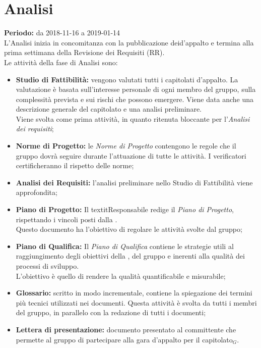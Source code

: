 \section{Analisi}
\textbf{Periodo:} da 2018-11-16 a 2019-01-14\\L'Analisi inizia in concomitanza con la pubblicazione deid’appalto e termina alla prima settimana della  Revisione dei Requisiti (RR).\\
Le attività della fase di Analisi sono:
\begin{itemize}
    \item \textbf{Studio di Fattibilità:} vengono valutati tutti i capitolati d'appalto. La valutazione è basata sull'interesse personale di ogni membro del gruppo, sulla complessità prevista e sui rischi che possono emergere. Viene data anche una descrizione generale del capitolato e una analisi preliminare.\\Viene svolta come prima attività, in quanto ritenuta bloccante per l'\textit{Analisi dei requisiti};
    \item \textbf{Norme di Progetto:} le \textit{Norme di Progetto} contengono le regole che il gruppo dovrà seguire durante l'attuazione di tutte le attività. I verificatori certificheranno il rispetto delle norme;
    \item \textbf{Analisi dei Requisiti:} l'analisi preliminare nello Studio di Fattibilità viene approfondita;
    \item \textbf{Piano di Progetto:} Il textit{Responsabile} redige il \textit{Piano di Progetto}, rispettando i vincoli posti dalla .\\Questo documento ha l'obiettivo di regolare le attività svolte dal gruppo;
    \item \textbf{Piano di Qualifica:} Il \textit{Piano di Qualifica} contiene le strategie utili al raggiungimento degli obiettivi della , del gruppo e inerenti alla qualità dei processi di sviluppo.\\L'obiettivo è quello di rendere la qualità quantificabile e misurabile;
    \item \textbf{Glossario:} scritto in modo incrementale, contiene la spiegazione dei termini più tecnici utilizzati nei documenti. Questa attività è svolta da tutti i membri del gruppo, in parallelo con la redazione di tutti i documenti;
    \item \textbf{Lettera di presentazione:} documento presentato al committente che permette al gruppo di partecipare alla gara d’appalto per il capitolato$_{G}$.
\end{itemize}
